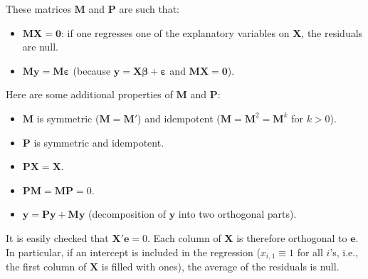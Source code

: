 \documentclass[
  12pt,
]{book}
\providecommand{\tightlist}{%
  \setlength{\itemsep}{0pt}\setlength{\parskip}{0pt}}
\theoremstyle{definition}
\theoremstyle{definition}
\theoremstyle{definition}
\theoremstyle{definition}
\theoremstyle{remark}
\begin{document}
These matrices \(\mathbf{M}\) and \(\mathbf{P}\) are such that:

\begin{itemize}
\tightlist
\item
  \(\mathbf{M} \mathbf{X} = \mathbf{0}\): if one regresses one of the explanatory variables on \(\mathbf{X}\), the residuals are null.
\item
  \(\mathbf{M}\mathbf{y}=\mathbf{M}\boldsymbol\varepsilon\) (because \(\mathbf{y} = \mathbf{X}\boldsymbol\beta + \boldsymbol\varepsilon\) and \(\mathbf{M} \mathbf{X} = \mathbf{0}\)).
\end{itemize}

Here are some additional properties of \(\mathbf{M}\) and \(\mathbf{P}\):

\begin{itemize}
\tightlist
\item
  \(\mathbf{M}\) is symmetric (\(\mathbf{M} = \mathbf{M}'\)) and idempotent (\(\mathbf{M} = \mathbf{M}^2 = \mathbf{M}^k\) for \(k>0\)).
\item
  \(\mathbf{P}\) is symmetric and idempotent.
\item
  \(\mathbf{P}\mathbf{X} = \mathbf{X}\).
\item
  \(\mathbf{P} \mathbf{M} = \mathbf{M} \mathbf{P} = 0\).
\item
  \(\mathbf{y} = \mathbf{P}\mathbf{y} + \mathbf{M}\mathbf{y}\) (decomposition of \(\mathbf{y}\) into two orthogonal parts).
\end{itemize}

It is easily checked that \(\mathbf{X}'\mathbf{e}=0\). Each column of \(\mathbf{X}\) is therefore orthogonal to \(\mathbf{e}\). In particular, if an intercept is included in the regression (\(x_{i,1} \equiv 1\) for all \(i\)'s, i.e., the first column of \(\mathbf{X}\) is filled with ones), the average of the residuals is null.
\end{document}
